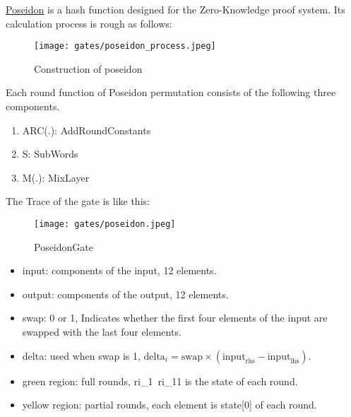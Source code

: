 
\hspace*{\fill}

\indent \href{https://www.poseidon-hash.info/}{Poseidon} is a hash function designed for the Zero-Knowledge proof system.
Its calculation process is rough as follows:

\begin{figure}[!ht]
    \centering
    \texttt{[image: gates/poseidon\_process.jpeg]}
    \caption{Construction of poseidon}
    \label{fig:poseidon-process}
\end{figure}

Each round function of Poseidon permutation consists of the following three components.
\begin{enumerate}
    \item ARC(.): AddRoundConstants
    \item S: SubWords
    \item M(.): MixLayer
\end{enumerate}

The Trace of the gate is like this:
\begin{figure}[!ht]
    \centering
    \texttt{[image: gates/poseidon.jpeg]}
    \caption{PoseidonGate}
    \label{fig:poseidon-gate}
\end{figure}

\begin{itemize}
    \item input: components of the input, 12 elements.
    \item output: components of the output, 12 elements.
    \item swap: 0 or 1, Indicates whether the first four elements of the input are swapped with the last four elements.
    \item delta: used when swap is 1, $\text{delta}_i = \text{swap} \times (\text{input}_{\text{rhs}} - \text{input}_{\text{lhs}})$.
    \item green region: full rounds, ri\_1~ri\_11 is the state of each round.
    \item yellow region: partial rounds, each element is state[0] of each round.
\end{itemize}


